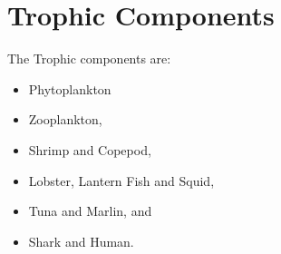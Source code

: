 \section{Trophic Components}
\label{sec:trophic-components}

The Trophic components are:

\begin{itemize}
    \item Phytoplankton
    \item Zooplankton,
    \item Shrimp and Copepod,
    \item Lobster, Lantern Fish and Squid,
    \item Tuna and Marlin, and
    \item Shark and Human.
\end{itemize}
